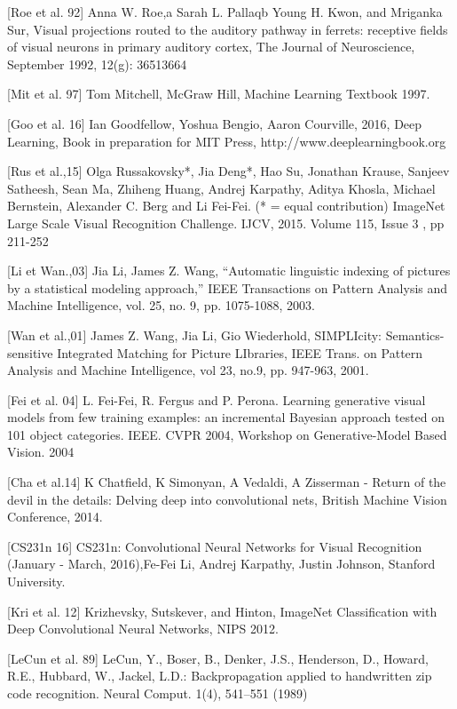 [Roe et al. 92] Anna W. Roe,a Sarah L. Pallaqb Young H. Kwon, and Mriganka Sur, Visual projections routed to the auditory pathway in ferrets: receptive fields of visual neurons in primary auditory cortex, The Journal of Neuroscience, September 1992, 12(g): 36513664

[Mit et al. 97] Tom Mitchell, McGraw Hill, Machine Learning Textbook 1997.

[Goo et al. 16] Ian Goodfellow, Yoshua Bengio, Aaron Courville, 2016, Deep Learning, Book in preparation for MIT Press, http://www.deeplearningbook.org






[Rus et al.,15] Olga Russakovsky*, Jia Deng*, Hao Su, Jonathan Krause, Sanjeev Satheesh, Sean Ma, Zhiheng Huang, Andrej Karpathy, Aditya Khosla, Michael Bernstein, Alexander C. Berg and Li Fei-Fei. (* = equal contribution) ImageNet Large Scale Visual Recognition Challenge. IJCV, 2015. Volume 115, Issue 3 , pp 211-252 

[Li et Wan.,03] Jia Li, James Z. Wang, ``Automatic linguistic indexing of pictures by a statistical modeling approach,'' IEEE Transactions on Pattern Analysis and Machine Intelligence, vol. 25, no. 9, pp. 1075-1088, 2003.

[Wan et al.,01] James Z. Wang, Jia Li, Gio Wiederhold, SIMPLIcity: Semantics-sensitive Integrated Matching for Picture LIbraries, IEEE Trans. on Pattern Analysis and Machine Intelligence, vol 23, no.9, pp. 947-963, 2001.

[Fei et al. 04] L. Fei-Fei, R. Fergus and P. Perona. Learning generative visual models from few training examples: an incremental Bayesian approach tested on 101 object categories. IEEE. CVPR 2004, Workshop on Generative-Model Based Vision. 2004

[Cha et al.14] K Chatfield, K Simonyan, A Vedaldi, A Zisserman - Return of the devil in the details: Delving deep into convolutional nets, British Machine Vision Conference, 2014.

[CS231n 16] CS231n: Convolutional Neural Networks for Visual Recognition (January - March, 2016),Fe-Fei Li, Andrej Karpathy, Justin Johnson, Stanford University.

[Kri et al. 12] Krizhevsky, Sutskever, and Hinton, ImageNet Classification with Deep Convolutional Neural Networks, NIPS 2012.

[LeCun et al. 89] LeCun, Y., Boser, B., Denker, J.S., Henderson, D., Howard, R.E., Hubbard, W., Jackel, L.D.: Backpropagation applied to handwritten zip code recognition. Neural
Comput. 1(4), 541–551 (1989)

